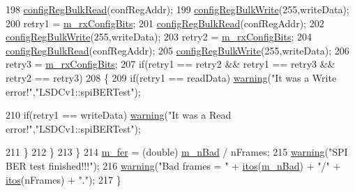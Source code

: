 \begin{DoxyCode}
198             \hyperlink{classLSDelayChipV1_a97a50092ce40f6322db946fc580f7230}{configRegBulkRead}(confRegAddr);
199 \hyperlink{classLSDelayChipV1_afa626b5d52f8723bcaa3205d1cc7a0f8}{configRegBulkWrite}(255,writeData);            
200             retry1 = \hyperlink{classLSDelayChipV1_ae049797212539b231b9722ae69a0491d}{m\_rxConfigBits};
201             \hyperlink{classLSDelayChipV1_a97a50092ce40f6322db946fc580f7230}{configRegBulkRead}(confRegAddr);
202 \hyperlink{classLSDelayChipV1_afa626b5d52f8723bcaa3205d1cc7a0f8}{configRegBulkWrite}(255,writeData);            
203             retry2 = \hyperlink{classLSDelayChipV1_ae049797212539b231b9722ae69a0491d}{m\_rxConfigBits};
204             \hyperlink{classLSDelayChipV1_a97a50092ce40f6322db946fc580f7230}{configRegBulkRead}(confRegAddr);
205 \hyperlink{classLSDelayChipV1_afa626b5d52f8723bcaa3205d1cc7a0f8}{configRegBulkWrite}(255,writeData);            
206             retry3 = \hyperlink{classLSDelayChipV1_ae049797212539b231b9722ae69a0491d}{m\_rxConfigBits};          
207             \textcolor{keywordflow}{if}(retry1 == retry2 && retry1 == retry3 && retry2 == retry3)
208             \{
209                 \textcolor{keywordflow}{if}(retry1 == readData)  \hyperlink{classObject_a65cd4fda577711660821fd2cd5a3b4c9}{warning}(\textcolor{stringliteral}{"It was a Write error!"},\textcolor{stringliteral}{"LSDCv1::spiBERTest"});      
          
210                 \textcolor{keywordflow}{if}(retry1 == writeData) \hyperlink{classObject_a65cd4fda577711660821fd2cd5a3b4c9}{warning}(\textcolor{stringliteral}{"It was a Read error!"},\textcolor{stringliteral}{"LSDCv1::spiBERTest"});       
         
211             \} 
212         \}
213     \}
214     \hyperlink{classLSDelayChipV1_a38d35de6a25fb1394ede2f39a4f25a08}{m\_fer} = (double) \hyperlink{classLSDelayChipV1_a425c69ef8f3d64d93cb1c86b83bbceec}{m\_nBad} / nFrames;
215     \hyperlink{classObject_a65cd4fda577711660821fd2cd5a3b4c9}{warning}(\textcolor{stringliteral}{"SPI BER test finished!!!"});
216     \hyperlink{classObject_a65cd4fda577711660821fd2cd5a3b4c9}{warning}(\textcolor{stringliteral}{"Bad frames = "} + \hyperlink{Tools_8h_af330027dbdafb9a30768b3613c553e60}{itos}(\hyperlink{classLSDelayChipV1_a425c69ef8f3d64d93cb1c86b83bbceec}{m\_nBad}) + \textcolor{stringliteral}{"/"} + \hyperlink{Tools_8h_af330027dbdafb9a30768b3613c553e60}{itos}(nFrames) + \textcolor{stringliteral}{"."});
217 \}
\end{DoxyCode}
\mbox{\label{classLSDelayChipV1_a7d4eb6fb7ca527286d36f30123bfd60a}} 
